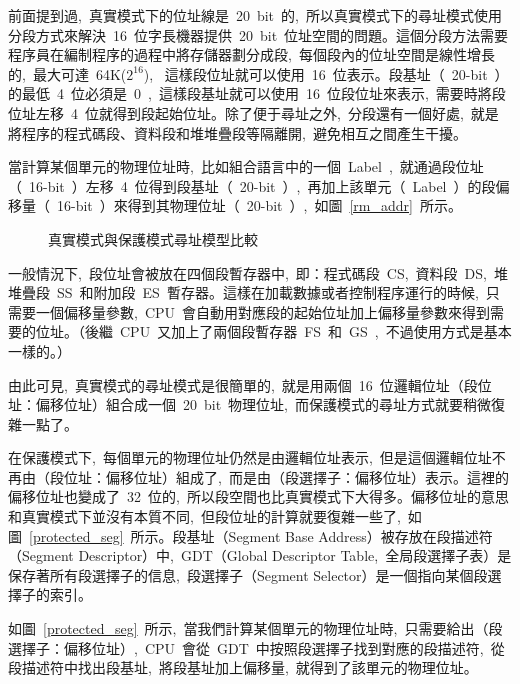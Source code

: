 前面提到過,~真實模式下的位址線是~20~bit~的,~所以真實模式下的尋址模式使用分段方式來解決~16~位字長機器提供~20~bit~位址空間的問題。這個分段方法需要程序員在編制程序的過程中將存儲器劃分成段,~每個段內的位址空間是線性增長的,~最大可達~64K($2^16$),~
這樣段位址就可以使用~16~位表示。段基址（~20-bit~）的最低~4~位必須是~0~,~這樣段基址就可以使用~16~位段位址來表示,~需要時將段位址左移~4~位就得到段起始位址。除了便于尋址之外,~分段還有一個好處,~就是將程序的程式碼段、資料段和堆堆疊段等隔離開,~避免相互之間產生干擾。

當計算某個單元的物理位址時,~比如組合語言中的一個~Label~,~就通過段位址（~16-bit~）左移~4~位得到段基址（~20-bit~）,~再加上該單元（~Label~）的段偏移量（~16-bit~）來得到其物理位址（~20-bit~）,~如圖~\ref{rm_addr}~所示。

\begin{figure*}[!t]
\centerline{
\hfil
{}}
\caption{真實模式與保護模式尋址模型比較}
\label{real_vs_pro}
\end{figure*}

一般情況下,~段位址會被放在四個段暫存器中,~即：程式碼段~CS,~資料段~DS,~堆堆疊段~SS~和附加段~ES~暫存器。這樣在加載數據或者控制程序運行的時候,~只需要一個偏移量參數,~CPU~會自動用對應段的起始位址加上偏移量參數來得到需要的位址。（後繼~CPU~又加上了兩個段暫存器~FS~和~GS~,~不過使用方式是基本一樣的。）

由此可見,~真實模式的尋址模式是很簡單的,~就是用兩個~16~位邏輯位址（段位址：偏移位址）組合成一個~20~bit~物理位址,~而保護模式的尋址方式就要稍微復雜一點了。


在保護模式下,~每個單元的物理位址仍然是由邏輯位址表示,~但是這個邏輯位址不再由（段位址：偏移位址）組成了,~而是由（段選擇子：偏移位址）表示。這裡的偏移位址也變成了~32~位的,~所以段空間也比真實模式下大得多。偏移位址的意思和真實模式下並沒有本質不同,~但段位址的計算就要復雜一些了,~如圖~\ref{protected_seg}~所示。段基址（Segment Base Address）被存放在段描述符（Segment Descriptor）中,~GDT（Global Descriptor Table,~全局段選擇子表）是保存著所有段選擇子的信息,~段選擇子（Segment Selector）是一個指向某個段選擇子的索引。

如圖~\ref{protected_seg}~所示,~當我們計算某個單元的物理位址時,~只需要給出（段選擇子：偏移位址）,~CPU~會從~GDT~中按照段選擇子找到對應的段描述符,~從段描述符中找出段基址,~將段基址加上偏移量,~就得到了該單元的物理位址。

